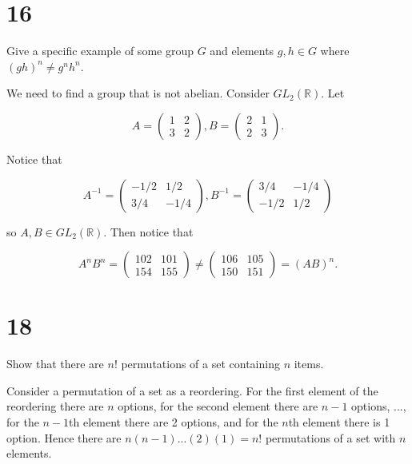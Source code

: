 \documentclass[a4paper]{article}
\begin{document}
\section*{16}

Give a specific example of some group $G$ and elements $g, h \in G$ where $(gh)^n \neq g^n h^n$. 

\vspace{\baselineskip}

We need to find a group that is not abelian. Consider $GL_2(\mathbb{R})$. Let 

$$A = 
  \begin{pmatrix}
    1 & 2 \\
    3 & 2
  \end{pmatrix},
  B = 
  \begin{pmatrix}
    2 & 1 \\
    2 & 3
  \end{pmatrix}.
$$

Notice that 

$$A^{-1} = 
  \begin{pmatrix}
    -1/2 & 1/2 \\
    3/4 & -1/4
  \end{pmatrix},
  B^{-1} = 
  \begin{pmatrix}
    3/4 & -1/4 \\
    -1/2 & 1/2 
  \end{pmatrix}
$$

so $A, B \in GL_2(\mathbb{R})$. Then notice that 

$$A^n B^n = \begin{pmatrix}
    102 & 101 \\
    154 & 155
  \end{pmatrix} \neq 
    \begin{pmatrix}
    106 & 105 \\
    150 & 151 
  \end{pmatrix} = (AB)^n.$$
  
  
\section*{18}

Show that there are $n!$ permutations of a set containing $n$ items.

\vspace{\baselineskip}

Consider a permutation of a set as a reordering. For the first element of the reordering there are $n$ options, for the second element there are $n-1$ options, ..., for the $n-1$th element there are 2 options, and for the $n$th element there is 1 option. Hence there are $n(n-1) ... (2)(1) = n!$ permutations of a set with $n$ elements.
  
\end{document}
